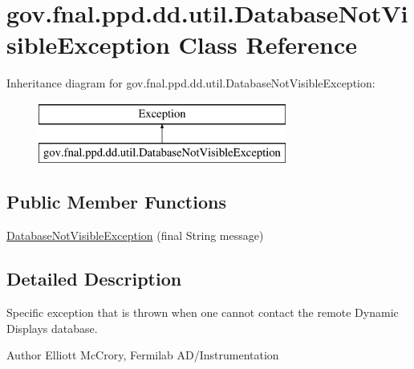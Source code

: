 \hypertarget{classgov_1_1fnal_1_1ppd_1_1dd_1_1util_1_1DatabaseNotVisibleException}{\section{gov.\-fnal.\-ppd.\-dd.\-util.\-Database\-Not\-Visible\-Exception Class Reference}
\label{classgov_1_1fnal_1_1ppd_1_1dd_1_1util_1_1DatabaseNotVisibleException}
}
Inheritance diagram for gov.\-fnal.\-ppd.\-dd.\-util.\-Database\-Not\-Visible\-Exception\-:\begin{figure}[H]
\begin{center}
\leavevmode
\includegraphics[height=2.000000cm]{classgov_1_1fnal_1_1ppd_1_1dd_1_1util_1_1DatabaseNotVisibleException}
\end{center}
\end{figure}
\subsection*{Public Member Functions}
\begin{DoxyCompactItemize}
\item 
\hyperlink{classgov_1_1fnal_1_1ppd_1_1dd_1_1util_1_1DatabaseNotVisibleException_a87d0b13a309fa5e1441794e704846e09}{Database\-Not\-Visible\-Exception} (final String message)
\end{DoxyCompactItemize}


\subsection{Detailed Description}
Specific exception that is thrown when one cannot contact the remote Dynamic Displays database.

\begin{DoxyAuthor}{Author}
Elliott Mc\-Crory, Fermilab A\-D/\-Instrumentation 
\end{DoxyAuthor}


